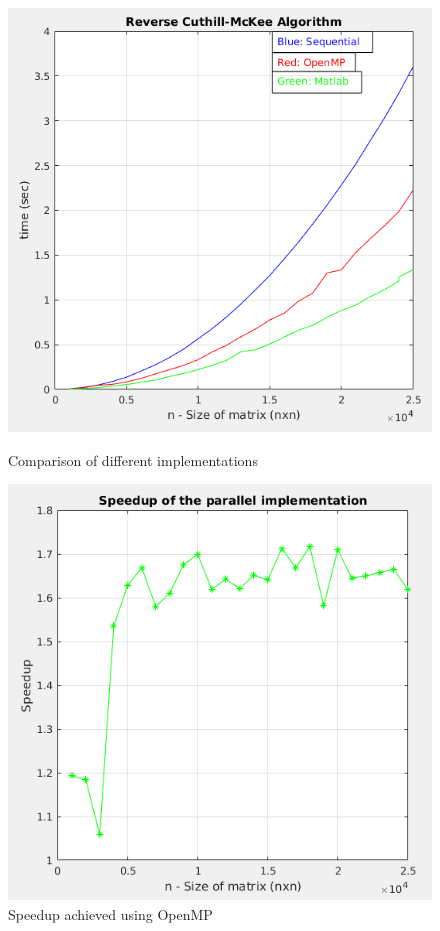 \documentclass[letterpaper,12pt]{article}
\begin{document}
\begin{figure}[!htb]
	\centering
	\begin{minipage}[b]{0.45\textwidth}
		\includegraphics[width=\textwidth]{images/rcm.png}
		\caption{Comparison of different implementations}
		\label{fig:rcm}
	\end{minipage}
	\hfill
	\begin{minipage}[b]{0.45\textwidth}
		\includegraphics[width=\textwidth]{images/speedup.png}
		\caption{Speedup achieved using OpenMP}
		\label{fig:speedup}
	\end{minipage}
\end{figure}
\end{document}
